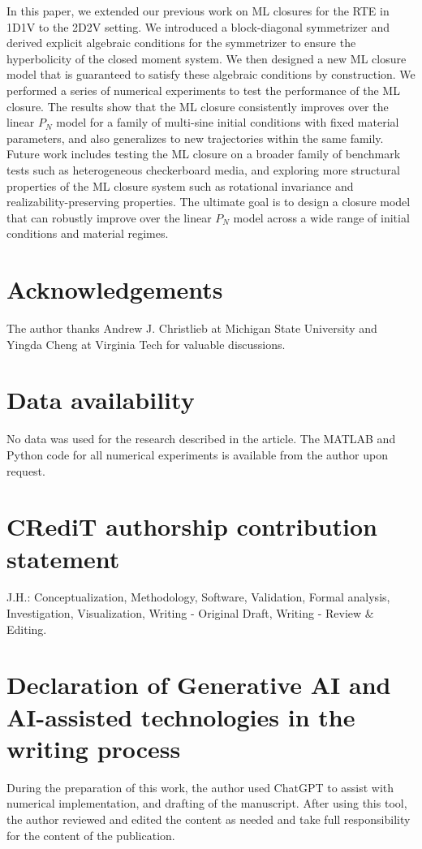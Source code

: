 \documentclass[11pt]{article}
\numberwithin{equation}{section}
\begin{document}
In this paper, we extended our previous work on ML closures for the RTE in 1D1V to the 2D2V setting. We introduced a block-diagonal symmetrizer and derived explicit algebraic conditions for the symmetrizer to ensure the hyperbolicity of the closed moment system. We then designed a new ML closure model that is guaranteed to satisfy these algebraic conditions by construction. We performed a series of numerical experiments to test the performance of the ML closure. The results show that the ML closure consistently improves over the linear $P_N$ model for a family of multi-sine initial conditions with fixed material parameters, and also generalizes to new trajectories within the same family. Future work includes testing the ML closure on a broader family of benchmark tests such as heterogeneous checkerboard media, and exploring more structural properties of the ML closure system such as rotational invariance and realizability-preserving properties. The ultimate goal is to design a closure model that can robustly improve over the linear $P_N$ model across a wide range of initial conditions and material regimes.


\section*{Acknowledgements}

The author thanks Andrew J. Christlieb at Michigan State University and Yingda Cheng at Virginia Tech for valuable discussions. 

\section*{Data availability}
No data was used for the research described in the article. The MATLAB and Python code for all numerical experiments is available from the author upon request.

\section*{CRediT authorship contribution statement}
J.H.: Conceptualization, Methodology, Software, Validation, Formal analysis, Investigation, Visualization, Writing - Original Draft, Writing - Review \& Editing.

\section*{Declaration of Generative AI and AI-assisted technologies in the
writing process}
During the preparation of this work, the author used ChatGPT to assist with numerical implementation, and drafting of the manuscript. After using this tool, the author reviewed and edited the content as needed and take full responsibility for the content of the publication.
\end{document}
